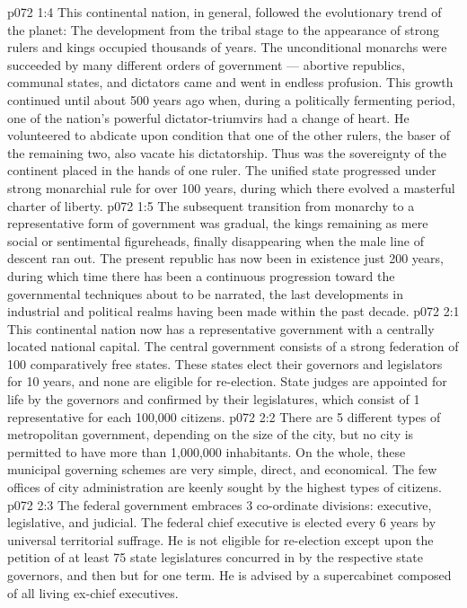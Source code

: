 \vs p072 1:4 \pc This continental nation, in general, followed the evolutionary trend of the planet: The development from the tribal stage to the appearance of strong rulers and kings occupied thousands of years. The unconditional monarchs were succeeded by many different orders of government --- abortive republics, communal states, and dictators came and went in endless profusion. This growth continued until about 500 years ago when, during a politically fermenting period, one of the nation’s powerful dictator\hyp{}triumvirs had a change of heart. He volunteered to abdicate upon condition that one of the other rulers, the baser of the remaining two, also vacate his dictatorship. Thus was the sovereignty of the continent placed in the hands of one ruler. The unified state progressed under strong monarchial rule for over 100 years, during which there evolved a masterful charter of liberty.
\vs p072 1:5 The subsequent transition from monarchy to a representative form of government was gradual, the kings remaining as mere social or sentimental figureheads, finally disappearing when the male line of descent ran out. The present republic has now been in existence just 200 years, during which time there has been a continuous progression toward the governmental techniques about to be narrated, the last developments in industrial and political realms having been made within the past decade.
\vs p072 2:1 This continental nation now has a representative government with a centrally located national capital. The central government consists of a strong federation of 100 comparatively free states. These states elect their governors and legislators for 10 years, and none are eligible for re\hyp{}election. State judges are appointed for life by the governors and confirmed by their legislatures, which consist of 1 representative for each 100,000 citizens.
\vs p072 2:2 There are 5 different types of metropolitan government, depending on the size of the city, but no city is permitted to have more than 1,000,000 inhabitants. On the whole, these municipal governing schemes are very simple, direct, and economical. The few offices of city administration are keenly sought by the highest types of citizens.
\vs p072 2:3 The federal government embraces 3 co\hyp{}ordinate divisions: executive, legislative, and judicial. The federal chief executive is elected every 6 years by universal territorial suffrage. He is not eligible for re\hyp{}election except upon the petition of at least 75 state legislatures concurred in by the respective state governors, and then but for one term. He is advised by a supercabinet composed of all living ex\hyp{}chief executives.
